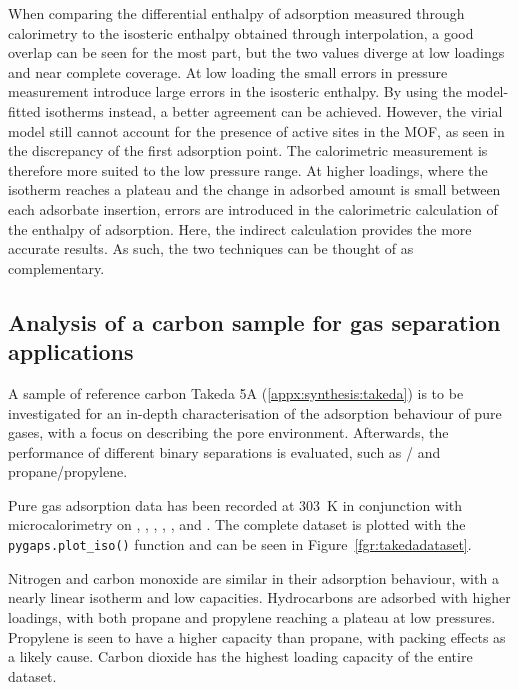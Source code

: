 When comparing the differential enthalpy of adsorption measured through
calorimetry to the isosteric enthalpy obtained through interpolation, 
a good overlap can be seen for the most part, but the two values
diverge at low loadings and near complete coverage. 
At low loading the small errors in pressure measurement introduce
large errors in the isosteric enthalpy. By using the model-fitted 
isotherms instead, a better agreement can be achieved. However, the 
virial model still cannot account for the presence of active sites in the 
MOF, as seen in the discrepancy of the first adsorption point.
The calorimetric measurement is therefore more suited to the low pressure
range. At higher loadings, where the isotherm reaches a plateau and
the change in adsorbed amount is small between each adsorbate
insertion, errors are introduced in the calorimetric calculation of
the enthalpy of adsorption.
Here, the indirect calculation provides the more accurate results.
As such, the two techniques can be thought of as complementary.

\subsection{Analysis of a carbon sample for gas separation applications}

A sample of reference carbon Takeda 5A (\autoref{appx:synthesis:takeda})
is to be investigated for an in-depth characterisation of
the adsorption behaviour of pure gases, with a focus on describing the pore environment.
Afterwards, the performance of different binary separations is evaluated,
such as / and propane/propylene.

Pure gas adsorption data has been recorded at \SI{303}{\kelvin} in
conjunction with
microcalorimetry on , , , , ,
 and . The complete dataset is plotted with the
\lstinline{pygaps.plot_iso()} function and can be seen in Figure~\ref{fgr:takedadataset}.

Nitrogen and carbon monoxide are similar in their adsorption behaviour,
with a nearly linear isotherm and low capacities.
Hydrocarbons are adsorbed with higher loadings, with both propane and propylene
reaching a plateau at low pressures. Propylene is seen to have a
higher capacity than propane, with packing effects as a likely cause.
Carbon dioxide has the highest loading capacity of the entire dataset.

